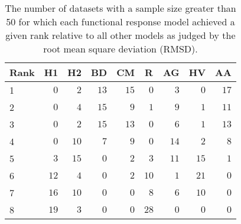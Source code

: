\begin{table}[!tbp]
\caption{The number of datasets with a sample size greater than 50 for which each functional response model achieved a given rank relative to all other models as judged by the root mean square deviation (RMSD).\label{table:RMSD_rankings_top50}} 
\begin{center}
\begin{tabular}{lrrrrrrrr}
\hline\hline
\multicolumn{1}{l}{Rank}&\multicolumn{1}{c}{H1}&\multicolumn{1}{c}{H2}&\multicolumn{1}{c}{BD}&\multicolumn{1}{c}{CM}&\multicolumn{1}{c}{R}&\multicolumn{1}{c}{AG}&\multicolumn{1}{c}{HV}&\multicolumn{1}{c}{AA}\tabularnewline
\hline
1&$ 0$&$ 2$&$13$&$15$&$ 0$&$ 3$&$ 0$&$17$\tabularnewline
2&$ 0$&$ 4$&$15$&$ 9$&$ 1$&$ 9$&$ 1$&$11$\tabularnewline
3&$ 0$&$ 2$&$15$&$13$&$ 0$&$ 6$&$ 1$&$13$\tabularnewline
4&$ 0$&$10$&$ 7$&$ 9$&$ 0$&$14$&$ 2$&$ 8$\tabularnewline
5&$ 3$&$15$&$ 0$&$ 2$&$ 3$&$11$&$15$&$ 1$\tabularnewline
6&$12$&$ 4$&$ 0$&$ 2$&$10$&$ 1$&$21$&$ 0$\tabularnewline
7&$16$&$10$&$ 0$&$ 0$&$ 8$&$ 6$&$10$&$ 0$\tabularnewline
8&$19$&$ 3$&$ 0$&$ 0$&$28$&$ 0$&$ 0$&$ 0$\tabularnewline
\hline
\end{tabular}\end{center}
\end{table}
